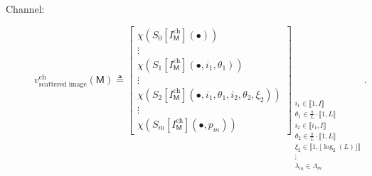 \begin{description}
                \item[Channel:]
                        \begin{equation}
                            \label{eq::channel_scatnet_image_based_features}
                            v^{\text{ch}}_{\text{scattered image}}\left(\mathsf{M}\right) \triangleq \begin{bmatrix}
                                \chi \left(S_0[I^{\text{ch}}_{\mathsf{M}}]\left(\bullet\right)\right)\\
                                \vdots\\
                                \chi \left(S_1[I^{\text{ch}}_{\mathsf{M}}]\left(\bullet, i_1, \theta_1\right)\right)\\
                                \vdots\\
                                \chi \left(S_2[I^{\text{ch}}_{\mathsf{M}}]\left(\bullet, i_1, \theta_1, i_2, \theta_2, \xi_2\right)\right)\\
                                \vdots\\
                                \chi \left(S_m[I^{\text{ch}}_{\mathsf{M}}]\left(\bullet, p_m\right)\right)
                            \end{bmatrix}_{
                                \substack{
                                    i_1 \in \llbracket 1, I \rrbracket\\
                                    \theta_1 \in \frac{\pi}{L} \cdot \llbracket 1, L \rrbracket\\
                                    i_2 \in \llbracket i_1, I \rrbracket\\
                                    \theta_2 \in \frac{\pi}{L} \cdot \llbracket 1, L \rrbracket\\
                                    \xi_2 \in \llbracket 1, \lfloor\log_2(L)\rfloor \rrbracket\\
                                    \vdots\\
                                    \lambda_m \in \Lambda_m
                                }
                            }.
                        \end{equation}
            \end{description}
